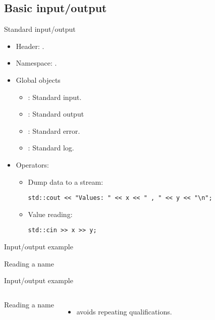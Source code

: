 \subsection{Basic input/output}

\begin{frame}[t,fragile]{Standard input/output}
\begin{itemize}
  \item Header: .
  \item Namespace: .
  \item Global objects
    \begin{itemize}
      \item {}: Standard input.
      \item {}: Standard output
      \item {}: Standard error.
      \item {}: Standard log.
    \end{itemize}
  \item Operators:
    \begin{itemize}
      \item Dump data to a stream:
\begin{lstlisting}
std::cout << "Values: " << x << " , " << y << "\n";
\end{lstlisting}
      \item Value reading:
\begin{lstlisting}
std::cin >> x >> y;
\end{lstlisting}
  \end{itemize}
\end{itemize}
\end{frame}

\begin{frame}[t,fragile]{Input/output example}
\begin{block}{Reading a name}

\end{block}
\end{frame}

\begin{frame}[t,fragile]{Input/output example}
\begin{columns}[T]

\begin{block}{Reading a name}

\end{block}

\begin{itemize}
  \item {} avoids repeating  qualifications.
\end{itemize}

\end{columns}
\end{frame}
